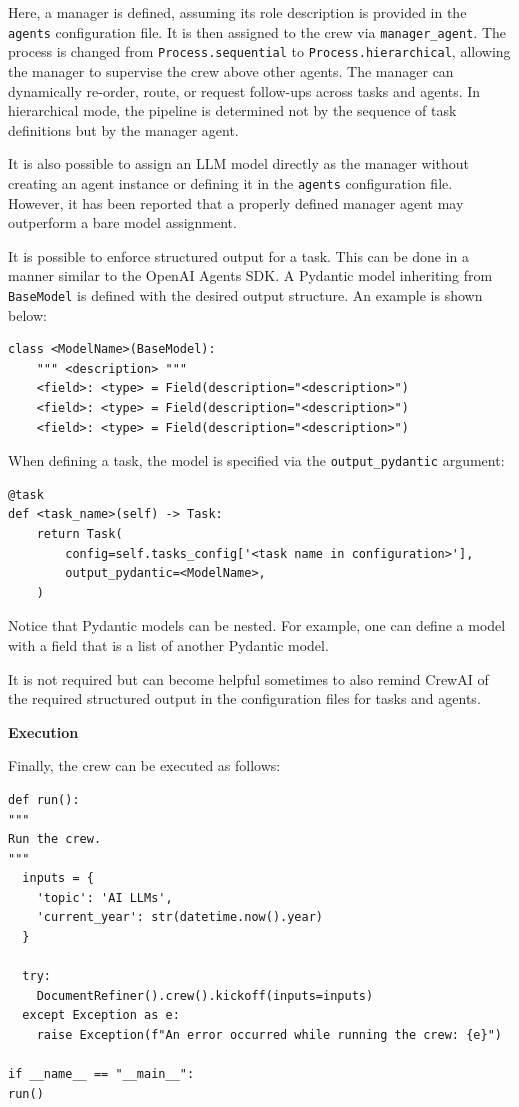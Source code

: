 Here, a manager is defined, assuming its role description is provided in the \verb|agents| configuration file. It is then assigned to the crew via \verb|manager_agent|. The process is changed from \verb|Process.sequential| to \verb|Process.hierarchical|, allowing the manager to supervise the crew above other agents. The manager can dynamically re-order, route, or request follow-ups across tasks and agents. In hierarchical mode, the pipeline is determined not by the sequence of task definitions but by the manager agent.

It is also possible to assign an LLM model directly as the manager without creating an agent instance or defining it in the \verb|agents| configuration file. However, it has been reported that a properly defined manager agent may outperform a bare model assignment.

It is possible to enforce structured output for a task. This can be done in a manner similar to the OpenAI Agents SDK. A Pydantic model inheriting from \verb|BaseModel| is defined with the desired output structure. An example is shown below:
\begin{lstlisting}
class <ModelName>(BaseModel):
    """ <description> """
    <field>: <type> = Field(description="<description>")
    <field>: <type> = Field(description="<description>")
    <field>: <type> = Field(description="<description>")
\end{lstlisting}
When defining a task, the model is specified via the \verb|output_pydantic| argument:
\begin{lstlisting}
@task
def <task_name>(self) -> Task:
    return Task(
        config=self.tasks_config['<task name in configuration>'],
        output_pydantic=<ModelName>,
    )
\end{lstlisting}
Notice that Pydantic models can be nested. For example, one can define a model with a field that is a list of another Pydantic model.

It is not required but can become helpful sometimes to also remind CrewAI of the required structured output in the configuration files for tasks and agents.

\vspace{0.1in}
\noindent \textbf{Execution}
\vspace{0.1in}

Finally, the crew can be executed as follows:
\begin{lstlisting}
def run():
"""
Run the crew.
"""
  inputs = {
	'topic': 'AI LLMs',
	'current_year': str(datetime.now().year)
  }

  try:
    DocumentRefiner().crew().kickoff(inputs=inputs)
  except Exception as e:
    raise Exception(f"An error occurred while running the crew: {e}")

if __name__ == "__main__":
run()
\end{lstlisting}

